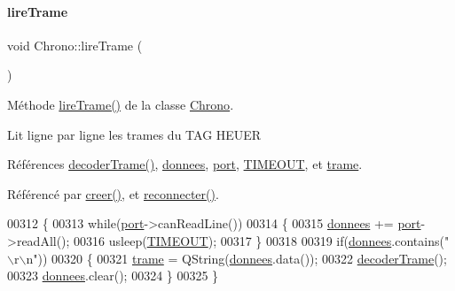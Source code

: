 \paragraph{\texorpdfstring{lire\+Trame}{lireTrame}}
{\footnotesize\ttfamily void Chrono\+::lire\+Trame (\begin{DoxyParamCaption}{ }\end{DoxyParamCaption})\hspace{0.3cm}{\ttfamily [slot]}}



Méthode \hyperlink{class_chrono_ae7c3c8494ace02f4c9dd714f6f0e574a}{lire\+Trame()} de la classe \hyperlink{class_chrono}{Chrono}. 

Lit ligne par ligne les trames du T\+AG H\+E\+U\+ER 

Références \hyperlink{class_chrono_a9a66b4e81385e2c354805548b94cdfb6}{decoder\+Trame()}, \hyperlink{class_chrono_a7771ee85460ad5f61f96cea2267ae23f}{donnees}, \hyperlink{class_chrono_aca5fbe0eebd7f876f954d4a99c564167}{port}, \hyperlink{chrono_8h_a45ba202b05caf39795aeca91b0ae547e}{T\+I\+M\+E\+O\+UT}, et \hyperlink{class_chrono_a26f2155aa6e5ef4296e5456b64a713b5}{trame}.



Référencé par \hyperlink{class_chrono_a74d85a4e856e2e59afacaa061feb7b75}{creer()}, et \hyperlink{class_chrono_a80305a5dae33e8cd99604e809589564b}{reconnecter()}.


\begin{DoxyCode}
00312 \{
00313     \textcolor{keywordflow}{while}(\hyperlink{class_chrono_aca5fbe0eebd7f876f954d4a99c564167}{port}->canReadLine())
00314     \{
00315         \hyperlink{class_chrono_a7771ee85460ad5f61f96cea2267ae23f}{donnees} += \hyperlink{class_chrono_aca5fbe0eebd7f876f954d4a99c564167}{port}->readAll();
00316         usleep(\hyperlink{chrono_8h_a45ba202b05caf39795aeca91b0ae547e}{TIMEOUT});
00317     \}
00318 
00319     \textcolor{keywordflow}{if}(\hyperlink{class_chrono_a7771ee85460ad5f61f96cea2267ae23f}{donnees}.contains(\textcolor{stringliteral}{"\(\backslash\)r\(\backslash\)n"}))
00320     \{
00321         \hyperlink{class_chrono_a26f2155aa6e5ef4296e5456b64a713b5}{trame} = QString(\hyperlink{class_chrono_a7771ee85460ad5f61f96cea2267ae23f}{donnees}.data());
00322         \hyperlink{class_chrono_a9a66b4e81385e2c354805548b94cdfb6}{decoderTrame}();
00323         \hyperlink{class_chrono_a7771ee85460ad5f61f96cea2267ae23f}{donnees}.clear();
00324     \}
00325 \}
\end{DoxyCode}
\mbox{\label{class_chrono_a38cf60f7ab1969d7fd1e672868156135}} 
